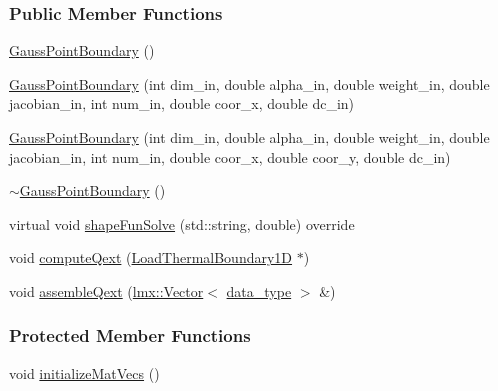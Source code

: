 \subsubsection*{Public Member Functions}
\begin{DoxyCompactItemize}
\item 
\hyperlink{classmknix_1_1_gauss_point_boundary_a77cc44a83e7cbe635c99943cb7e2f975}{Gauss\+Point\+Boundary} ()
\item 
\hyperlink{classmknix_1_1_gauss_point_boundary_a2bedbbba293a2e220df87bb4fc1d8d64}{Gauss\+Point\+Boundary} (int dim\+\_\+in, double alpha\+\_\+in, double weight\+\_\+in, double jacobian\+\_\+in, int num\+\_\+in, double coor\+\_\+x, double dc\+\_\+in)
\item 
\hyperlink{classmknix_1_1_gauss_point_boundary_a01163e6ce3f4aaa13fa1006d0fe8773f}{Gauss\+Point\+Boundary} (int dim\+\_\+in, double alpha\+\_\+in, double weight\+\_\+in, double jacobian\+\_\+in, int num\+\_\+in, double coor\+\_\+x, double coor\+\_\+y, double dc\+\_\+in)
\item 
\hyperlink{classmknix_1_1_gauss_point_boundary_a8b93a88e494cca61934ae841642e11f5}{$\sim$\+Gauss\+Point\+Boundary} ()
\item 
virtual void \hyperlink{classmknix_1_1_gauss_point_boundary_ab57edfe411e088a9839cf266bd4ff784}{shape\+Fun\+Solve} (std\+::string, double) override
\item 
void \hyperlink{classmknix_1_1_gauss_point_boundary_a404a6ee4731bab04ef54f6fc0a58986c}{compute\+Qext} (\hyperlink{classmknix_1_1_load_thermal_boundary1_d}{Load\+Thermal\+Boundary1\+D} $\ast$)
\item 
void \hyperlink{classmknix_1_1_gauss_point_boundary_a4a64fbf026dc5c92ac29aa0337807d04}{assemble\+Qext} (\hyperlink{classlmx_1_1_vector}{lmx\+::\+Vector}$<$ \hyperlink{namespacemknix_a16be4b246fbf2cceb141e3a179111020}{data\+\_\+type} $>$ \&)
\end{DoxyCompactItemize}
\subsubsection*{Protected Member Functions}
\begin{DoxyCompactItemize}
\item 
void \hyperlink{classmknix_1_1_gauss_point_boundary_a236bd2db3efbe86c5597f797d0164d2f}{initialize\+Mat\+Vecs} ()
\end{DoxyCompactItemize}
